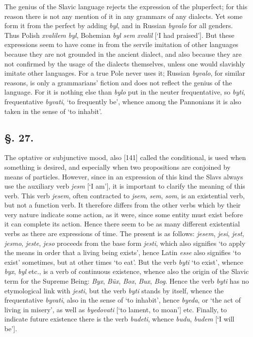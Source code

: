 The genius of the Slavic language rejects the expression of the pluperfect; for this reason there is not any mention of it in any grammars of any dialects. Yet some form it from the perfect by adding \textit{byl}, and in Russian \textit{byvalo} for all genders. Thus Polish \textit{xvalilem byl}, Bohemian \textit{byl sem xvalil} [‘I had praised’]. But these expressions seem to have come in from the servile imitation of other languages because they are not grounded in the ancient dialect, and also because they are not confirmed by the usage of the dialects themselves, unless one would slavishly imitate other languages. For a true Pole never uses it; Russian \textit{byvalo}, for similar reasons, is only a grammarians’ fiction and does not reflect the genius of the language. For it is nothing else than \textit{bylo} put in the neuter frequentative, so \textit{byti}, frequentative \textit{byvati}, ‘to frequently be’, whence among the Pannonians it is also taken in the sense of ‘to inhabit’.

\subsection*{\hspace*{\fill}§. 27.\hspace*{\fill}}

The optative or subjunctive mood, also [141] called the conditional, is used when something is desired, and especially when two propositions are conjoined by means of particles. However, since in an expression of this kind the Slavs always use the auxiliary verb \textit{jesm} [‘I am’], it is important to clarify the meaning of this verb. This verb \textit{jesem}, often contracted to \textit{jsem}, \textit{sem}, \textit{som}, is an existential verb, but not a function verb. It therefore differs from the other verbs which by their very nature indicate some action, as it were, since some entity must exist before it can complete its action. Hence there seem to be as many different existential verbs as there are expressions of time. The present is as follows: \textit{jesem}, \textit{jesi}, \textit{jest}, \textit{jesmo}, \textit{jeste}, \textit{jeso} proceeds from the base form \textit{jesti}, which also signifies ‘to apply the means in order that a living being exists’, hence Latin \textit{esse} also signifies ‘to exist’ sometimes, but at other times ‘to eat’. But the verb \textit{byti} ‘to exist’, whence \textit{byx}, \textit{byl} etc., is a verb of continuous existence, whence also the origin of the Slavic term for the Supreme Being: \textit{Byx}, \textit{Büx}, \textit{Box}, \textit{Bux}, \textit{Bog}. Hence the verb \textit{byti} has no etymological link with \textit{jesti}, but the verb \textit{byti} stands by itself, whence the frequentative \textit{byvati}, also in the sense of ‘to inhabit’, hence \textit{byeda}, or ‘the act of living in misery’, as well as \textit{byedovati} [‘to lament, to moan’] etc. Finally, to indicate future existence there is the verb \textit{budeti}, whence \textit{budu}, \textit{budem} [‘I will be’].

